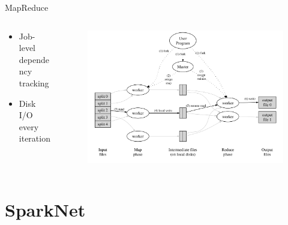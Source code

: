 \documentclass[pdf]{beamer}
\begin{document}
\begin{frame}{MapReduce \cite{dean2008mapreduce}}
    \begin{columns}
        \begin{column}{0.3\textwidth}
            \begin{itemize}
                \item Job-level dependency tracking
                \item Disk I/O every iteration
            \end{itemize}
        \end{column}
        \begin{column}{0.7\textwidth}
            \begin{figure}[htpb]
                \centering
                \includegraphics[width=\linewidth]{Figures/mapreduce.png}
            \end{figure}
        \end{column}
    \end{columns}
\end{frame}


\section{SparkNet}

\begin{frame}
    \titlepage
\end{frame}
\end{document}
